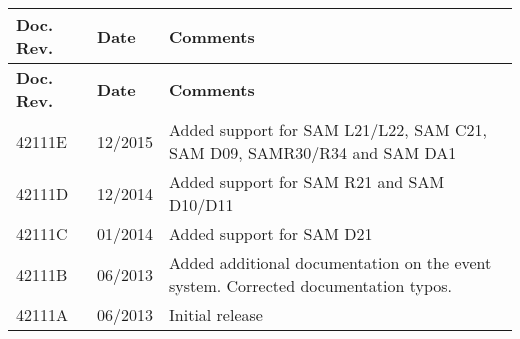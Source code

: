 \tabulinesep=1mm
\begin{longtabu}spread 0pt [c]{*{3}{|X[-1]}|}
\hline
\cellcolor{\tableheadbgcolor}\textbf{ Doc. Rev. }&\cellcolor{\tableheadbgcolor}\textbf{ Date }&\cellcolor{\tableheadbgcolor}\textbf{ Comments  }\\
\endfirsthead
\hline
\endfoot
\hline
\cellcolor{\tableheadbgcolor}\textbf{ Doc. Rev. }&\cellcolor{\tableheadbgcolor}\textbf{ Date }&\cellcolor{\tableheadbgcolor}\textbf{ Comments  }\\
\endhead
42111E &12/2015 &Added support for SAM L21/\+L22, SAM C21, SAM D09, SAMR30/\+R34 and SAM DA1  \\
42111D &12/2014 &Added support for SAM R21 and SAM D10/\+D11  \\
42111C &01/2014 &Added support for SAM D21  \\
42111B &06/2013 &Added additional documentation on the event system. Corrected documentation typos.  \\
42111A &06/2013 &Initial release  \\
\end{longtabu}
